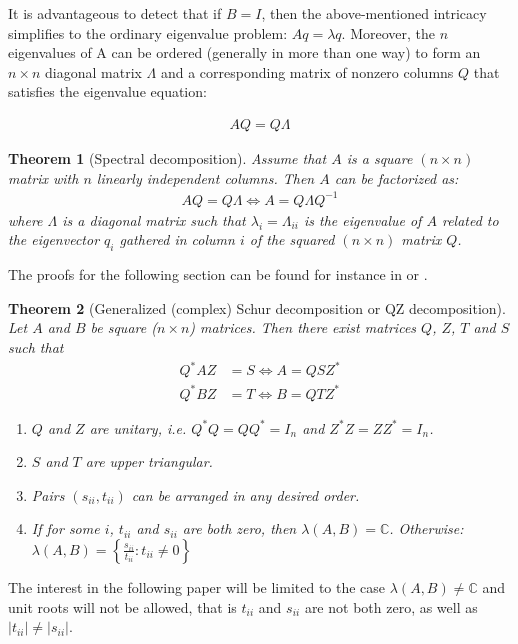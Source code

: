 \documentclass{pracamgr}
\numberwithin{equation}{section}
\newtheorem{theorem}{Theorem}
\begin{document}
It is advantageous to detect that if $B=I$, then the above-mentioned intricacy simplifies to the ordinary eigenvalue problem: $A q = \lambda q$. Moreover, the $n$ eigenvalues of A can be ordered (generally in more than one way) to form an $n\times n$ diagonal matrix $\Lambda$ and a corresponding matrix of nonzero columns $Q$ that satisfies the eigenvalue equation:

\begin{align}
AQ = Q\Lambda
\end{align}

\begin{theorem}[Spectral decomposition]
Assume that $A$ is a square $(n\times n)$ matrix with $n$ linearly independent columns. Then $A$ can be factorized as:
  \begin{align*}
  AQ = Q \Lambda \Leftrightarrow A = Q \Lambda Q^{-1}
  \end{align*} 
where $\Lambda$ is a diagonal matrix such that $\lambda_i =\Lambda_{ii}$ is the eigenvalue of $A$ related to the eigenvector $q_i$ gathered in column $i$ of the squared $(n \times n)$ matrix $Q$.
\end{theorem}

The proofs for the following section can be found for instance in \citet{roman2008graduate} or \citet{brown1988second}.  

\begin{theorem}[Generalized (complex) Schur decomposition or QZ decomposition]
Let $A$ and $B$ be square ($n\times n$) matrices. Then there exist matrices $Q$, $Z$, $T$ and $S$ such that
\begin{align*}
  Q^* A Z &= S \Leftrightarrow A = Q S Z^*\\
  Q^* B Z &= T \Leftrightarrow B = Q T Z^*
\end{align*}
\begin{enumerate}
  \item $Q$ and $Z$ are unitary, i.e. $Q^*Q=QQ^*=I_n$ and $Z^*Z=ZZ^*=I_n$.
  \item $S$ and $T$ are upper triangular.
 \item Pairs $(s_{ii},t_{ii})$ can be arranged in any desired order.
  \item If for some $i$, $t_{ii}$ and $s_{ii}$ are both zero, then $\lambda(A,B)=\mathbb{C}$. Otherwise:
$\lambda(A,B) = \left\{\frac{s_{ii}}{t_{ii}}:t_{ii} \neq 0 \right\}$
\end{enumerate}
\end{theorem}

The interest in the following paper will be limited to the case $\lambda(A,B)\neq \mathbb{C}$ and unit roots will not be allowed, that is $t_{ii}$ and $s_{ii}$ are not both zero, as well as $|t_{ii}|\neq |s_{ii}|$.
\end{document}
